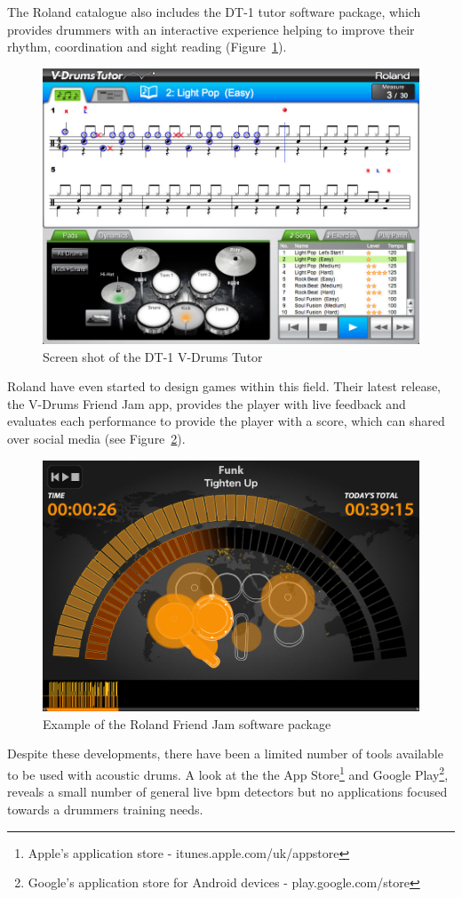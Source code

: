 \documentclass[a4paper, 11pt]{article}
\begin{document}
The Roland catalogue also includes the DT-1 tutor software package, which provides drummers with an interactive experience helping to improve their rhythm, coordination and sight reading \cite{roland} (Figure~\ref{fig: dt-1}).\par 
\begin{figure}[h]
\centering
  \includegraphics[width=0.5\linewidth]{images/dt-1_ss_main_notation_gal.jpg}
  \caption{Screen shot of the DT-1 V-Drums Tutor \cite{roland}}
  \label{fig: dt-1}
\end{figure}
Roland have even started to design games within this field. Their latest release, the V-Drums Friend Jam app, provides the player with live feedback and evaluates each performance to provide the player with a score, which can shared over social media (see Figure~\ref{fig: friendjam}). \par

\begin{figure}[h]
\centering
\includegraphics[scale=0.2]{images/friendjam.png}
\caption{Example of the Roland Friend Jam software package \cite{roland}}
\label{fig: friendjam}
\end{figure}

Despite these developments, there have been a limited number of tools available to be used with acoustic drums. A look at the the App Store\footnote{Apple's application store - itunes.apple.com/uk/appstore‎} and Google Play\footnote{Google's application store for Android devices - play.google.com/store}, reveals a small number of general live bpm detectors but no applications focused towards a drummers training needs.\par
\end{document}
